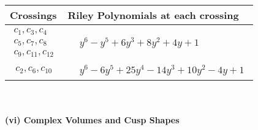 \documentclass[1p]{elsarticle_modified}
\theoremstyle{definition}
\begin{document}
\begin{tabular}{m{50pt}|m{274pt}}
Crossings & \hspace{64pt}Riley Polynomials at each crossing \\
\hline $$\begin{aligned}c_{1},c_{3},c_{4}\\c_{5},c_{7},c_{8}\\c_{9},c_{11},c_{12}\end{aligned}$$&$\begin{aligned}
&y^6- y^5+6 y^3+8 y^2+4 y+1
\end{aligned}$\\
\hline $$\begin{aligned}c_{2},c_{6},c_{10}\end{aligned}$$&$\begin{aligned}
&y^6-6 y^5+25 y^4-14 y^3+10 y^2-4 y+1
\end{aligned}$\\
\hline
\end{tabular}\\~\\
\newpage\flushleft \textbf{(vi) Complex Volumes and Cusp Shapes}
\end{document}
